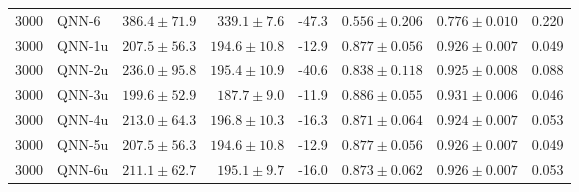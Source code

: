 \begin{longtable}{rlrrrrrr}
3000 & QNN-6 & $386.4 \pm 71.9$ & $339.1 \pm 7.6$ & -47.3 & $0.556 \pm 0.206$ & $0.776 \pm 0.010$ & 0.220 \\
3000 & QNN-1u & $207.5 \pm 56.3$ & $194.6 \pm 10.8$ & -12.9 & $0.877 \pm 0.056$ & $0.926 \pm 0.007$ & 0.049 \\
3000 & QNN-2u & $236.0 \pm 95.8$ & $195.4 \pm 10.9$ & -40.6 & $0.838 \pm 0.118$ & $0.925 \pm 0.008$ & 0.088 \\
3000 & QNN-3u & $199.6 \pm 52.9$ & $187.7 \pm 9.0$ & -11.9 & $0.886 \pm 0.055$ & $0.931 \pm 0.006$ & 0.046 \\
3000 & QNN-4u & $213.0 \pm 64.3$ & $196.8 \pm 10.3$ & -16.3 & $0.871 \pm 0.064$ & $0.924 \pm 0.007$ & 0.053 \\
3000 & QNN-5u & $207.5 \pm 56.3$ & $194.6 \pm 10.8$ & -12.9 & $0.877 \pm 0.056$ & $0.926 \pm 0.007$ & 0.049 \\
3000 & QNN-6u & $211.1 \pm 62.7$ & $195.1 \pm 9.7$ & -16.0 & $0.873 \pm 0.062$ & $0.926 \pm 0.007$ & 0.053 \\
\end{longtable}
\par{}
